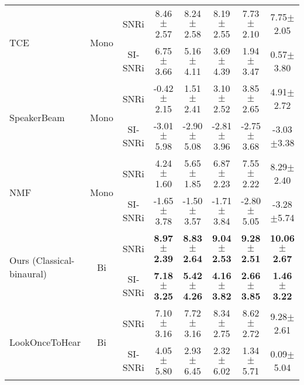 \begin{table*}[!t]
\begin{center}
{\begin{tabular}{lccccccc}
\multirow{2}{*}{TCE \cite{Chen2024tce}} & \multirow{2}{*}{Mono} & SNRi   & 8.46$\pm$2.57 & 8.24$\pm$2.58 & 8.19$\pm$2.55 & 7.73$\pm$2.10 & 7.75$\pm$2.05 \\
                     & & SI-SNRi & 6.75$\pm$3.66 & 5.16$\pm$4.11 & 3.69$\pm$4.39 & 1.94$\pm$3.47 & 0.57$\pm$3.80 \\
\midrule
\multirow{2}{*}{SpeakerBeam \cite{speakerbeam}} & \multirow{2}{*}{Mono} & SNRi   & -0.42$\pm$2.15 & 1.51$\pm$2.41 & 3.10$\pm$2.52 & 3.85$\pm$2.65 & 4.91$\pm$2.72 \\
                     & & SI-SNRi & -3.01$\pm$5.98 & -2.90$\pm$5.08 & -2.81$\pm$3.96 & -2.75$\pm$3.68 & -3.03$\pm$3.38 \\
\midrule
\multirow{2}{*}{NMF \cite{NMF}} & \multirow{2}{*}{Mono} & SNRi      & 4.24$\pm$1.60 & 5.65$\pm$1.85 & 6.87$\pm$2.23 & 7.55$\pm$2.22 & 8.29$\pm$2.40 \\
                     & & SI-SNRi   & -1.65$\pm$3.78 & -1.50$\pm$3.57 & -1.71$\pm$3.84 & -2.80$\pm$5.05 & -3.28$\pm$5.74 \\
\midrule \midrule
\multirow{2}{*}{Ours (Classical-binaural)} & \multirow{2}{*}{Bi} & SNRi   & \textbf{8.97$\pm$2.39} & \textbf{8.83$\pm$2.64} & \textbf{9.04$\pm$2.53} & \textbf{9.28$\pm$2.51} & \textbf{10.06$\pm$2.67} \\
                    & & SI-SNRi & \textbf{7.18$\pm$3.25} & \textbf{5.42$\pm$4.26} & \textbf{4.16$\pm$3.82} & \textbf{2.66$\pm$3.85} & \textbf{1.46$\pm$3.22} \\
\midrule
\multirow{2}{*}{LookOnceToHear \cite{Veluri2024lookonce}} & \multirow{2}{*}{Bi} & SNRi   & 7.10$\pm$3.16 & 7.72$\pm$3.16 & 8.34$\pm$2.75 & 8.62$\pm$2.72 & 9.28$\pm$2.61 \\
                     & & SI-SNRi & 4.05$\pm$5.80 & 2.93$\pm$6.45 & 2.32$\pm$6.02 & 1.34$\pm$5.71 & 0.09$\pm$5.04 \\


\end{tabular}}
\end{center}
\end{table*}
